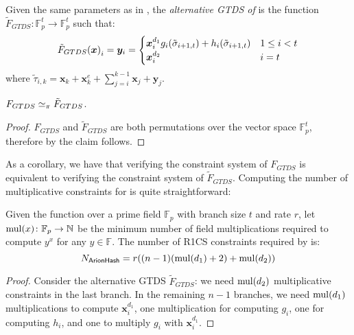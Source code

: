\begin{definition}
  Given the same parameters as in , the \emph{alternative GTDS of \Arion} is the
  function \(\tilde{F}_{GTDS}\colon \mathbb{F}_p^t \to \mathbb{F}_p^t\) such that:
  \[
    \call{\tilde{F}_{GTDS}}{\bm{x}}_i = \bm{y}_i =
    \begin{cases}
      \bm{x}_i^{d_1}\call{g_i}{\tilde{\sigma}_{i+1,t}} + 
        \call{h_i}{\tilde{\sigma}_{i+1,t}} & 1 \le i < t \\
      \bm{x}_i^{d_2} & i = t
    \end{cases}
  \]
  where \(\tilde{\tau}_{i, k} = \bm{x}_k + \bm{x}_{k}^{e} + \sum_{j=i}^{k-1}{\bm{x}_j + \bm{y}_j}\).

\end{definition}

\begin{proposition}
  \(F_{GTDS} \simeq_{\pi} \tilde{F}_{GTDS}\).
\end{proposition}
\begin{proof}
  \(F_{GTDS}\) and \(\tilde{F}_{GTDS}\) are both permutations over the vector space \(\mathbb{F}_p^t\),
  therefore by  the claim follows.
\end{proof}

As a corollary, we have that verifying the constraint system of \(F_{GTDS}\) is equivalent to 
verifying the constraint system of \(\tilde{F}_{GTDS}\).
Computing the number of multiplicative constraints for \Arionhash{} is quite straightforward:
\begin{lemma}
  Given the \Arionhash{} function over a prime field \(\mathbb{F}_p\) with branch size 
  \(t\) and rate \(r\), let \(\call{\minmul}{x}\colon \mathbb{F}_p \to \mathbb{N}\) be the minimum
  number of field multiplications required to compute \(y^x\) for any \(y \in \mathbb{F}\).
  The number of R1CS constraints required by \Arionhash{} is:
  \[
    N_{\Arionhash} = 
      r\Parens*{\Parens*{n - 1}\Parens*{\call{\minmul}{d_1} + 2} + \call{\minmul}{d_2}}
  \]
\end{lemma}
\begin{proof}
  Consider the alternative GTDS \(\tilde{F}_{GTDS}\): we need \(\call{\minmul}{d_2}\) 
  multiplicative constraints in the last branch.
  In the remaining \(n - 1\) branches, we need \(\call{\minmul}{d_1}\) multiplications to 
  compute \(\bm{x}_i^{d_1}\), one multiplication for computing \(g_i\), one for computing \(h_i\), 
  and one to multiply \(g_i\) with \(\bm{x}_i^{d_1}\).
\end{proof}

